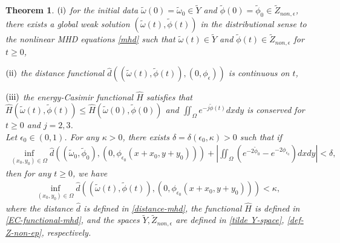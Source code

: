 \documentclass[1 [leqno, 11pt]{amsart}
\numberwithin{equation}{section}
\let\ep=\epsilon
\newtheorem{Theorem}{Theorem}[section]
\begin{document}
\begin{CJK*}{GBK}{song}
\begin{Theorem}
 $({\rm i})$ for the initial data $\tilde \omega(0)=\tilde \omega_0\in\tilde Y$ and $\tilde \phi(0)=\tilde \phi_0\in\tilde Z_{non,\ep}$,  there exists a global weak solution $(\tilde \omega(t),\tilde \phi(t))$ in the distributional sense to the nonlinear MHD equations \eqref{mhd} such that $\tilde \omega(t)\in\tilde Y$ and $\tilde \phi(t)\in \tilde  Z_{non,\ep}$ for $t\geq0$,


 $({\rm ii})$ the distance functional $\hat d((\tilde \omega(t),\tilde \phi(t)),(0,\phi_{\ep}))$
is  continuous on $t$,

$({\rm iii})$  the energy-Casimir functional $\hat H$ satisfies that  $\hat H(\tilde \omega(t),\tilde \phi(t))\leq \hat H(\tilde \omega(0),\tilde \phi(0))$  and $\iint_\Omega e^{-j\tilde\phi(t)}dxdy$ is conserved for $t\geq0$ and $j=2,3$. \\
Let $\ep_0\in(0,1)$. For any $\kappa>0$, there exists $\delta=\delta(\ep_0,\kappa)>0$ such that if
\begin{align}\label{initial data-mhd}
\inf_{(x_0,y_0)\in\Omega} \hat d((\tilde\omega_0,\tilde \phi_0),(0,\phi_{\ep_0}(x+x_0,y+y_0)))+\left|\iint_{\Omega}(e^{-2\tilde \phi_0}-e^{-2\phi_{\ep_0}})dxdy\right|<\delta,
 \end{align}
  then
  for any $t\geq0$, we have
\begin{align}\label{onlinear orbital stability-goal-mhd}
\inf_{(x_0,y_0)\in\Omega} \hat d((\tilde\omega(t),\tilde \phi(t)),(0,\phi_{\ep_0}(x+x_0,y+y_0)))<\kappa,
\end{align}
where the distance  $\hat d$ is defined in \eqref{distance-mhd}, the functional $\hat H$ is defined in \eqref{EC-functional-mhd}, and the spaces $\tilde Y, \tilde Z_{non,\ep}$ are defined in \eqref{tilde Y-space}, \eqref{def-Z-non-ep}, respectively.
\end{Theorem}


\medskip

\medskip


\end{CJK*}
\end{document}
